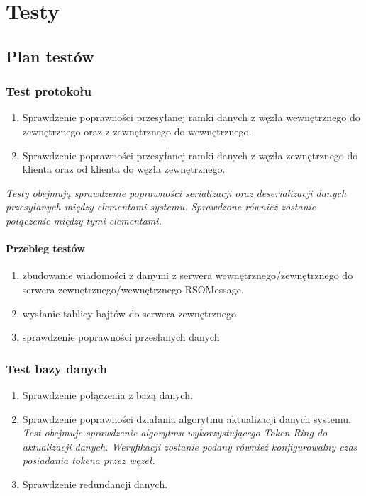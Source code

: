 \chapter{Testy}

\section{Plan testów}


\subsection[Test protokołu]{Test protokołu}
\begin{enumerate}
\item Sprawdzenie poprawności przesyłanej ramki danych z węzła wewnętrznego do zewnętrznego oraz z zewnętrznego do wewnętrznego.
\item Sprawdzenie poprawności przesyłanej ramki danych z węzła zewnętrznego do klienta oraz od klienta do węzła zewnętrznego.
\end{enumerate}
	
\textit{Testy obejmują sprawdzenie poprawności serializacji oraz deserializacji danych przesyłanych między elementami systemu. Sprawdzone również zostanie połączenie między tymi elementami.}

\subsubsection*[Przebieg testów]{Przebieg testów}
\begin{enumerate}
\item zbudowanie wiadomości z danymi z serwera wewnętrznego/zewnętrznego do serwera zewnętrznego/wewnętrznego RSOMessage.
\item wysłanie tablicy bajtów do serwera zewnętrznego 
\item sprawdzenie poprawności przesłanych danych
\end{enumerate}


\subsection[Test bazy danych]{Test bazy danych}
\begin{enumerate}
\item Sprawdzenie połączenia z bazą danych.
\item Sprawdzenie poprawności działania algorytmu aktualizacji danych systemu. \\
\textit{Test obejmuje sprawdzenie algorytmu wykorzystującego Token Ring do aktualizacji danych. Weryfikacji zostanie podany również konfigurowalny czas posiadania tokena przez węzeł.}
\item Sprawdzenie redundancji danych.
\end{enumerate}



